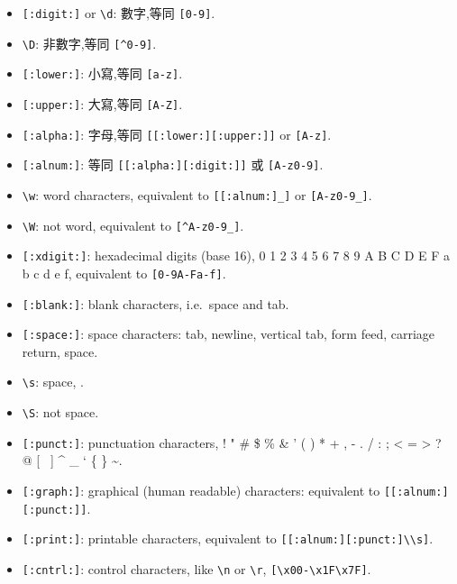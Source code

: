 \documentclass[]{book}
\providecommand{\tightlist}{%
  \setlength{\itemsep}{0pt}\setlength{\parskip}{0pt}}
\theoremstyle{definition}
\theoremstyle{definition}
\theoremstyle{definition}
\theoremstyle{remark}
\begin{document}
\begin{itemize}
\tightlist
\item
  \texttt{{[}:digit:{]}} or \texttt{\textbackslash{}d}: 數字,等同
  \texttt{{[}0-9{]}}.\\
\item
  \texttt{\textbackslash{}D}: 非數字,等同 \texttt{{[}\^{}0-9{]}}.\\
\item
  \texttt{{[}:lower:{]}}: 小寫,等同 \texttt{{[}a-z{]}}.\\
\item
  \texttt{{[}:upper:{]}}: 大寫,等同 \texttt{{[}A-Z{]}}.\\
\item
  \texttt{{[}:alpha:{]}}: 字母,等同
  \texttt{{[}{[}:lower:{]}{[}:upper:{]}{]}} or \texttt{{[}A-z{]}}.\\
\item
  \texttt{{[}:alnum:{]}}: 等同 \texttt{{[}{[}:alpha:{]}{[}:digit:{]}{]}}
  或 \texttt{{[}A-z0-9{]}}.\\
\item
  \texttt{\textbackslash{}w}: word characters, equivalent to
  \texttt{{[}{[}:alnum:{]}\_{]}} or \texttt{{[}A-z0-9\_{]}}.\\
\item
  \texttt{\textbackslash{}W}: not word, equivalent to
  \texttt{{[}\^{}A-z0-9\_{]}}.\\
\item
  \texttt{{[}:xdigit:{]}}: hexadecimal digits (base 16), 0 1 2 3 4 5 6 7
  8 9 A B C D E F a b c d e f, equivalent to \texttt{{[}0-9A-Fa-f{]}}.
\item
  \texttt{{[}:blank:{]}}: blank characters, i.e.~space and tab.\\
\item
  \texttt{{[}:space:{]}}: space characters: tab, newline, vertical tab,
  form feed, carriage return, space.
\item
  \texttt{\textbackslash{}s}: space, \texttt{}.\\
\item
  \texttt{\textbackslash{}S}: not space.\\
\item
  \texttt{{[}:punct:{]}}: punctuation characters, ! " \# \$ \% \& ' ( )
  * + , - . / : ; \textless{} = \textgreater{} ? @ {[} ~{]} \^{} \_ ` \{
  \textbar{} \} \textasciitilde{}.
\item
  \texttt{{[}:graph:{]}}: graphical (human readable) characters:
  equivalent to \texttt{{[}{[}:alnum:{]}{[}:punct:{]}{]}}.
\item
  \texttt{{[}:print:{]}}: printable characters, equivalent to
  \texttt{{[}{[}:alnum:{]}{[}:punct:{]}\textbackslash{}\textbackslash{}s{]}}.
\item
  \texttt{{[}:cntrl:{]}}: control characters, like
  \texttt{\textbackslash{}n} or \texttt{\textbackslash{}r},
  \texttt{{[}\textbackslash{}x00-\textbackslash{}x1F\textbackslash{}x7F{]}}.
\end{itemize}
\end{document}
